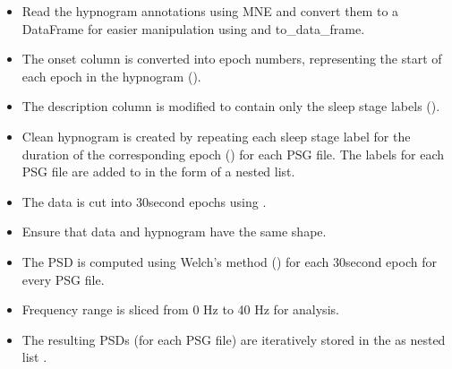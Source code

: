 \documentclass[letterpaper,10pt,english]{sphinxmanual}
\begin{document}
\sphinxAtStartPar
{}
\begin{itemize}
\item {} 
\sphinxAtStartPar
Read the hypnogram annotations using MNE and convert them to a DataFrame for easier manipulation using  and \textasciigrave{}\textasciigrave{} to\_data\_frame\textasciigrave{}\textasciigrave{}.

\item {} 
\sphinxAtStartPar
The onset column is converted into epoch numbers, representing the start of each epoch in the hypnogram ().

\item {} 
\sphinxAtStartPar
The description column is modified to contain only the sleep stage labels ().

\item {} 
\sphinxAtStartPar
Clean hypnogram is created by repeating each sleep stage label for the duration of the corresponding epoch () for each PSG file. The labels for each PSG file are added to  in the form of a nested list.

\end{itemize}

\sphinxAtStartPar
{}
\begin{itemize}
\item {} 
\sphinxAtStartPar
The data is cut into 30\sphinxhyphen{}second epochs using .

\item {} 
\sphinxAtStartPar
Ensure that data and hypnogram have the same shape.

\item {} 
\sphinxAtStartPar
The PSD is computed using Welch’s method () for each 30\sphinxhyphen{}second epoch for every PSG file.

\item {} 
\sphinxAtStartPar
Frequency range is sliced from 0 Hz to 40 Hz for analysis.

\item {} 
\sphinxAtStartPar
The resulting PSDs (for each PSG file) are iteratively stored in the  as nested list .

\end{itemize}
\end{document}
